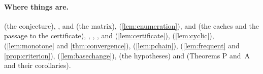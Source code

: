 \paragraph{Where things are.}  (the conjecture), , 
and  (the matrix),  (\cref{lem:enumeration}),  and
 (the caches and the passage to the certificate), , , ,  and 
(\cref{lem:certificate}),  (\cref{lem:cyclic}),  (\cref{lem:monotone} and
\cref{thm:convergence}),  (\cref{lem:pchain}),  (\cref{lem:frequent} and
\cref{prop:criterion}),  (\cref{lem:basechange}),  (the hypotheses) and
 (Theorems P and~A and their corollaries).
